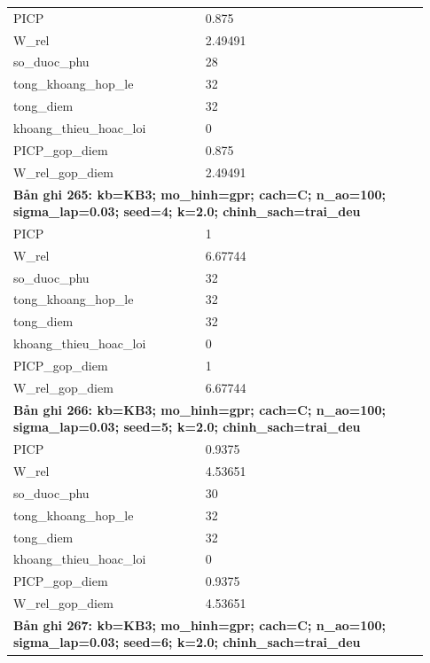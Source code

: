 \begin{longtable}{p{0.43\linewidth}p{0.50\linewidth}}
PICP & 0.875 \\
W\_\allowbreak rel & 2.49491 \\
so\_\allowbreak duoc\_\allowbreak phu & 28 \\
tong\_\allowbreak khoang\_\allowbreak hop\_\allowbreak le & 32 \\
tong\_\allowbreak diem & 32 \\
khoang\_\allowbreak thieu\_\allowbreak hoac\_\allowbreak loi & 0 \\
PICP\_\allowbreak gop\_\allowbreak diem & 0.875 \\
W\_\allowbreak rel\_\allowbreak gop\_\allowbreak diem & 2.49491 \\
\midrule
\multicolumn{2}{p{0.95\linewidth}}{\textbf{Bản ghi 265: kb=KB3; mo\_hinh=gpr; cach=C; n\_ao=100; sigma\_lap=0.03; seed=4; k=2.0; chinh\_sach=trai\_deu}} \\
PICP & 1 \\
W\_\allowbreak rel & 6.67744 \\
so\_\allowbreak duoc\_\allowbreak phu & 32 \\
tong\_\allowbreak khoang\_\allowbreak hop\_\allowbreak le & 32 \\
tong\_\allowbreak diem & 32 \\
khoang\_\allowbreak thieu\_\allowbreak hoac\_\allowbreak loi & 0 \\
PICP\_\allowbreak gop\_\allowbreak diem & 1 \\
W\_\allowbreak rel\_\allowbreak gop\_\allowbreak diem & 6.67744 \\
\midrule
\multicolumn{2}{p{0.95\linewidth}}{\textbf{Bản ghi 266: kb=KB3; mo\_hinh=gpr; cach=C; n\_ao=100; sigma\_lap=0.03; seed=5; k=2.0; chinh\_sach=trai\_deu}} \\
PICP & 0.9375 \\
W\_\allowbreak rel & 4.53651 \\
so\_\allowbreak duoc\_\allowbreak phu & 30 \\
tong\_\allowbreak khoang\_\allowbreak hop\_\allowbreak le & 32 \\
tong\_\allowbreak diem & 32 \\
khoang\_\allowbreak thieu\_\allowbreak hoac\_\allowbreak loi & 0 \\
PICP\_\allowbreak gop\_\allowbreak diem & 0.9375 \\
W\_\allowbreak rel\_\allowbreak gop\_\allowbreak diem & 4.53651 \\
\midrule
\multicolumn{2}{p{0.95\linewidth}}{\textbf{Bản ghi 267: kb=KB3; mo\_hinh=gpr; cach=C; n\_ao=100; sigma\_lap=0.03; seed=6; k=2.0; chinh\_sach=trai\_deu}} \\

\end{longtable}
